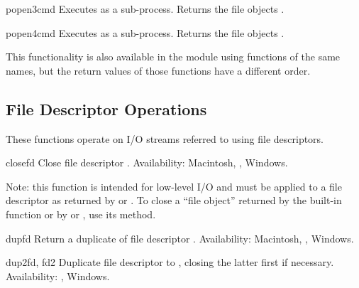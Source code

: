 \begin{funcdesc}{popen3}{cmd}
Executes  as a sub-process.  Returns the file objects
.
\end{funcdesc}

\begin{funcdesc}{popen4}{cmd}
Executes  as a sub-process.  Returns the file objects
.
\end{funcdesc}

This functionality is also available in the  module
using functions of the same names, but the return values of those
functions have a different order.


\subsection{File Descriptor Operations \label{os-fd-ops}}

These functions operate on I/O streams referred to
using file descriptors.


\begin{funcdesc}{close}{fd}
Close file descriptor .
Availability: Macintosh, \UNIX{}, Windows.

Note: this function is intended for low-level I/O and must be applied
to a file descriptor as returned by  or
.  To close a ``file object'' returned by the
built-in function  or by  or
, use its  method.
\end{funcdesc}

\begin{funcdesc}{dup}{fd}
Return a duplicate of file descriptor .
Availability: Macintosh, \UNIX{}, Windows.
\end{funcdesc}

\begin{funcdesc}{dup2}{fd, fd2}
Duplicate file descriptor  to , closing the latter
first if necessary.
Availability: \UNIX{}, Windows.
\end{funcdesc}

